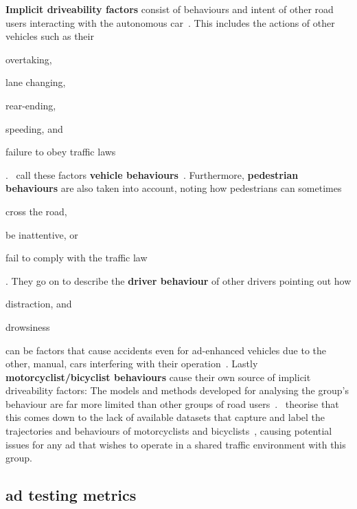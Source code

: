 \textbf{Implicit driveability factors} consist of behaviours and intent of other road users
interacting with the autonomous car~\cite[3138]{safeToDrive}. This includes the actions of other
vehicles such as their \begin{inparaenum}
    \item overtaking,
    \item lane changing,
    \item rear-ending,
    \item speeding, and
    \item failure to obey traffic laws \end{inparaenum}.~\citeauthor{safeToDrive} call these factors
\textbf{vehicle behaviours}~\cite[3138]{safeToDrive}. Furthermore, \textbf{pedestrian behaviours}
are also taken into account, noting how pedestrians can sometimes
\begin{inparaenum}\setcounter{enumi}{5}
    \item cross the road,
    \item be inattentive, or
    \item fail to comply with the traffic law \end{inparaenum}\cite[3138]{safeToDrive}. They go on
to describe the \textbf{driver behaviour} of other drivers pointing out how
\begin{inparaenum}\setcounter{enumi}{8}
    \item distraction, and
    \item drowsiness \end{inparaenum} can be factors that cause accidents even for
\acrshort{ad}-enhanced vehicles due to the other, manual, cars
interfering with their operation~\cite[3138-3139]{safeToDrive}. Lastly
\textbf{motorcyclist/bicyclist behaviours} cause their own source of implicit driveability factors:
The models and methods developed for analysing the group's behaviour are far more limited than other
groups of road users~\cite[3139]{safeToDrive}.~\citeauthor{safeToDrive} theorise that this comes
down to the lack of available datasets that capture and label the trajectories and behaviours
of motorcyclists and bicyclists~\cite[3139]{safeToDrive}, causing potential issues for any
\acrshort{ad} that wishes to operate in a shared traffic environment with this group.

\subsection{\acrlong{ad} testing metrics}\label{sec:adsMetrics}

